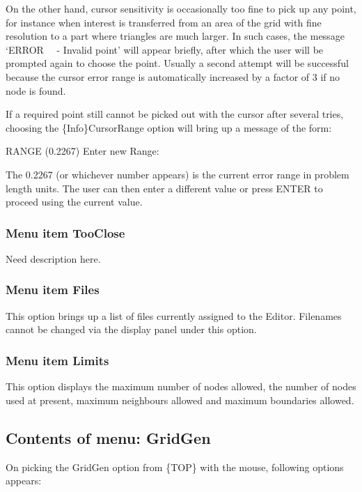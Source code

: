 \documentclass{article}
\begin{document}
On the other hand, cursor sensitivity is occasionally too fine to pick up any point, for instance when interest is transferred from an area of the grid with fine resolution to a part where triangles are much larger. In such cases, the message `ERROR \ \ {}- Invalid point' will appear briefly, after which the user will be prompted again to choose the point. Usually a second attempt will be successful because the cursor error range is automatically increased by a factor of 3 if no node is found.

If a required point still cannot be picked out with the cursor after several tries, choosing the \{Info\}CursorRange option will bring up a message of the form:

RANGE (0.2267) Enter new Range:

The 0.2267 (or whichever number appears) is the current error range in problem length units. The user can then enter a different value or press ENTER to proceed using the current value.

\subsubsection[Menu item AutoRange]{Menu item TooClose}

Need description here.

\subsubsection[Menu item Files]{Menu item Files}
This option brings up a list of files currently assigned to the Editor. Filenames cannot be changed via the display panel under this option.

\subsubsection[Menu item Limits]{Menu item Limits}
This option displays the maximum number of nodes allowed, the number of nodes used at present, maximum neighbours allowed and maximum boundaries allowed.

\subsection{Contents of menu: GridGen}
On picking the GridGen option from \{TOP\} with the mouse, following options appears:
\end{document}
